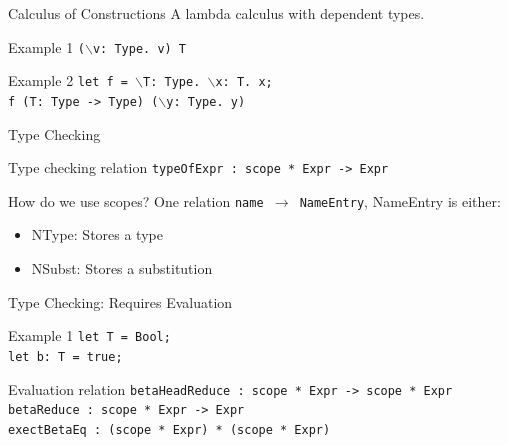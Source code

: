 \documentclass[aspectratio=43]{beamer}
\begin{document}
\begin{frame}[fragile]{Calculus of Constructions}
	A lambda calculus with dependent types.
	
	\begin{exampleblock}{Example 1}
		\texttt{($\backslash$v: Type. v) T}
	\end{exampleblock}

	\begin{exampleblock}{Example 2}
		\texttt{let f = $\backslash$T: Type. $\backslash$x: T. x; \\
f (T: Type -> Type) ($\backslash$y: Type. y)
		}
	\end{exampleblock}
\end{frame}

\begin{frame}[fragile]{Type Checking}
	\begin{block}{Type checking relation}
		\texttt{typeOfExpr : scope * Expr -> Expr}
	\end{block}
	\begin{block}{How do we use scopes?}
		One relation \texttt{name $\rightarrow$ NameEntry}, NameEntry is either:
		\begin{itemize}
			\item NType: Stores a type
			\item NSubst: Stores a substitution
		\end{itemize}
	\end{block}
\end{frame}

\begin{frame}[fragile]{Type Checking: Requires Evaluation}
	\begin{exampleblock}{Example 1}
		\texttt{let T = Bool;\\let b: T = true;}
	\end{exampleblock}
	\begin{block}{Evaluation relation} 
		\texttt{betaHeadReduce : scope * Expr -> scope * Expr} \\
		\texttt{betaReduce : scope * Expr -> Expr} \\
		\texttt{exectBetaEq : (scope * Expr) * (scope * Expr)}
	\end{block}
\end{frame}
\end{document}
